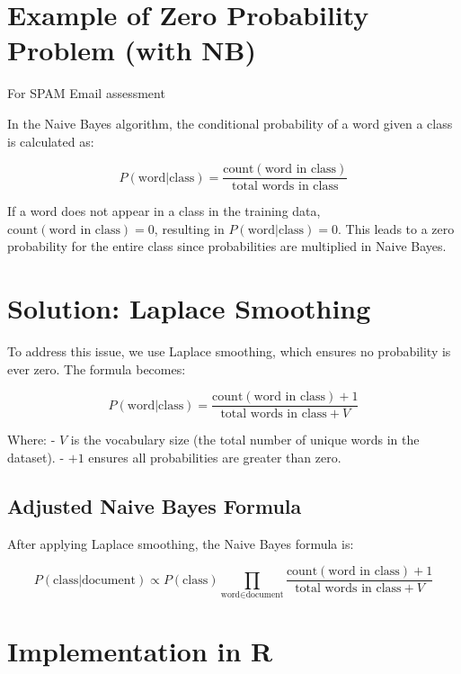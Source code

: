 \documentclass[
  12 pt,
  a4paper,
]{book}
\numberwithin{equation}{section}
\theoremstyle{plain}      %
\theoremstyle{definition} %
\theoremstyle{remark}     %
\theoremstyle{note}         %
\begin{document}
\newpage

\hypertarget{example-of-zero-probability-problem-with-nb}{%
\section{Example of Zero Probability Problem (with
NB)}\label{example-of-zero-probability-problem-with-nb}}

For SPAM Email assessment

In the Naive Bayes algorithm, the conditional probability of a word
given a class is calculated as:

\[
P(\text{word} | \text{class}) = \frac{\text{count}(\text{word in class})}{\text{total words in class}}
\]

If a word does not appear in a class in the training data,
\(\text{count}(\text{word in class}) = 0\), resulting in
\(P(\text{word} | \text{class}) = 0\). This leads to a zero probability
for the entire class since probabilities are multiplied in Naive Bayes.

\hypertarget{solution-laplace-smoothing}{%
\section{Solution: Laplace Smoothing}\label{solution-laplace-smoothing}}

To address this issue, we use Laplace smoothing, which ensures no
probability is ever zero. The formula becomes:

\[
P(\text{word} | \text{class}) = \frac{\text{count}(\text{word in class}) + 1}{\text{total words in class} + V}
\]

Where: - \(V\) is the vocabulary size (the total number of unique words
in the dataset). - \(+1\) ensures all probabilities are greater than
zero.

\hypertarget{adjusted-naive-bayes-formula}{%
\subsection{Adjusted Naive Bayes
Formula}\label{adjusted-naive-bayes-formula}}

After applying Laplace smoothing, the Naive Bayes formula is:

\[
P(\text{class} | \text{document}) \propto P(\text{class}) \prod_{\text{word} \in \text{document}} \frac{\text{count}(\text{word in class}) + 1}{\text{total words in class} + V}
\]

\hypertarget{implementation-in-r}{%
\section{Implementation in R}\label{implementation-in-r}}
\end{document}
